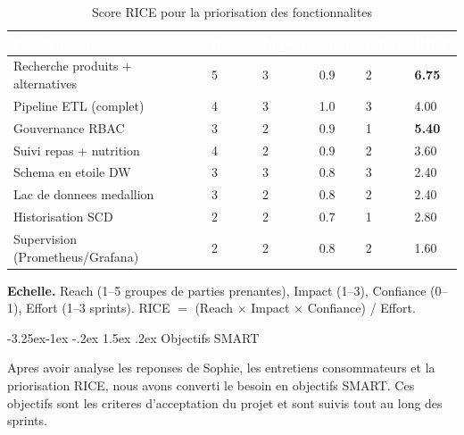 \documentclass[a4paper,11pt,oneside,openany]{report}
\makeatletter
\renewcommand\subsection{\@startsection{subsection}{2}{\z@}%
  {-3.25ex\@plus -1ex \@minus -.2ex}%
  {1.5ex \@plus .2ex}%
  {\normalfont\large\bfseries\color{ntdarkgreen}}}
\makeatother
\begin{document}
\begin{table}[H]
\centering
\caption{Score RICE pour la priorisation des fonctionnalites}
\label{tab:rice}
\begin{tabularx}{\textwidth}{L{3.5cm} C{1.2cm} C{1.2cm} C{1.2cm} C{1.2cm} C{1.5cm}}
\toprule
{}
\textcolor{white}{\textbf{Fonctionnalite}} & \textcolor{white}{\textbf{Reach}} & \textcolor{white}{\textbf{Impact}} & \textcolor{white}{\textbf{Conf.}} & \textcolor{white}{\textbf{Effort}} & \textcolor{white}{\textbf{RICE}} \\
\midrule
{}
Recherche produits + alternatives & 5 & 3 & 0.9 & 2 & \textbf{\textcolor{ntgreen}{6.75}} \\
Pipeline ETL (complet) & 4 & 3 & 1.0 & 3 & 4.00 \\
Gouvernance RBAC & 3 & 2 & 0.9 & 1 & \textbf{\textcolor{ntgreen}{5.40}} \\
Suivi repas + nutrition & 4 & 2 & 0.9 & 2 & 3.60 \\
Schema en etoile DW & 3 & 3 & 0.8 & 3 & 2.40 \\
Lac de donnees medallion & 3 & 2 & 0.8 & 2 & 2.40 \\
Historisation SCD & 2 & 2 & 0.7 & 1 & 2.80 \\
Supervision (Prometheus/Grafana) & 2 & 2 & 0.8 & 2 & 1.60 \\
\bottomrule
\end{tabularx}
\end{table}

{\footnotesize \textbf{Echelle.} Reach (1--5 groupes de parties prenantes),
Impact (1--3), Confiance (0--1), Effort (1--3 sprints).
RICE $=$ (Reach $\times$ Impact $\times$ Confiance) / Effort.}

\subsection{Objectifs SMART}

Apres avoir analyse les reponses de Sophie, les entretiens
consommateurs et la priorisation RICE, nous avons converti le besoin
en objectifs SMART. Ces objectifs sont les criteres d'acceptation du
projet et sont suivis tout au long des sprints.
\end{document}
